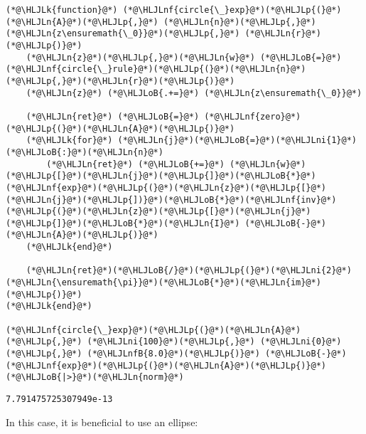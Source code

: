 \documentclass[12pt,a4paper]{article}
\newcommand{\HLJLk}[1]{\textcolor[RGB]{148,91,176}{\textbf{#1}}}
\newcommand{\HLJLn}[1]{#1}
\newcommand{\HLJLnf}[1]{\textcolor[RGB]{66,102,213}{#1}}
\newcommand{\HLJLnfB}[1]{\textcolor[RGB]{59,151,46}{#1}}
\newcommand{\HLJLni}[1]{\textcolor[RGB]{59,151,46}{#1}}
\newcommand{\HLJLoB}[1]{\textcolor[RGB]{102,102,102}{\textbf{#1}}}
\newcommand{\HLJLp}[1]{#1}
\begin{document}
\begin{lstlisting}
(*@\HLJLk{function}@*) (*@\HLJLnf{circle{\_}exp}@*)(*@\HLJLp{(}@*)(*@\HLJLn{A}@*)(*@\HLJLp{,}@*) (*@\HLJLn{n}@*)(*@\HLJLp{,}@*) (*@\HLJLn{z\ensuremath{\_0}}@*)(*@\HLJLp{,}@*) (*@\HLJLn{r}@*)(*@\HLJLp{)}@*)
    (*@\HLJLn{z}@*)(*@\HLJLp{,}@*)(*@\HLJLn{w}@*) (*@\HLJLoB{=}@*) (*@\HLJLnf{circle{\_}rule}@*)(*@\HLJLp{(}@*)(*@\HLJLn{n}@*)(*@\HLJLp{,}@*)(*@\HLJLn{r}@*)(*@\HLJLp{)}@*)
    (*@\HLJLn{z}@*) (*@\HLJLoB{.+=}@*) (*@\HLJLn{z\ensuremath{\_0}}@*)

    (*@\HLJLn{ret}@*) (*@\HLJLoB{=}@*) (*@\HLJLnf{zero}@*)(*@\HLJLp{(}@*)(*@\HLJLn{A}@*)(*@\HLJLp{)}@*)
    (*@\HLJLk{for}@*) (*@\HLJLn{j}@*)(*@\HLJLoB{=}@*)(*@\HLJLni{1}@*)(*@\HLJLoB{:}@*)(*@\HLJLn{n}@*)
        (*@\HLJLn{ret}@*) (*@\HLJLoB{+=}@*) (*@\HLJLn{w}@*)(*@\HLJLp{[}@*)(*@\HLJLn{j}@*)(*@\HLJLp{]}@*)(*@\HLJLoB{*}@*)(*@\HLJLnf{exp}@*)(*@\HLJLp{(}@*)(*@\HLJLn{z}@*)(*@\HLJLp{[}@*)(*@\HLJLn{j}@*)(*@\HLJLp{])}@*)(*@\HLJLoB{*}@*)(*@\HLJLnf{inv}@*)(*@\HLJLp{(}@*)(*@\HLJLn{z}@*)(*@\HLJLp{[}@*)(*@\HLJLn{j}@*)(*@\HLJLp{]}@*)(*@\HLJLoB{*}@*)(*@\HLJLn{I}@*) (*@\HLJLoB{-}@*) (*@\HLJLn{A}@*)(*@\HLJLp{)}@*)
    (*@\HLJLk{end}@*)

    (*@\HLJLn{ret}@*)(*@\HLJLoB{/}@*)(*@\HLJLp{(}@*)(*@\HLJLni{2}@*)(*@\HLJLn{\ensuremath{\pi}}@*)(*@\HLJLoB{*}@*)(*@\HLJLn{im}@*)(*@\HLJLp{)}@*)
(*@\HLJLk{end}@*)

(*@\HLJLnf{circle{\_}exp}@*)(*@\HLJLp{(}@*)(*@\HLJLn{A}@*)(*@\HLJLp{,}@*) (*@\HLJLni{100}@*)(*@\HLJLp{,}@*) (*@\HLJLni{0}@*)(*@\HLJLp{,}@*) (*@\HLJLnfB{8.0}@*)(*@\HLJLp{)}@*) (*@\HLJLoB{-}@*)(*@\HLJLnf{exp}@*)(*@\HLJLp{(}@*)(*@\HLJLn{A}@*)(*@\HLJLp{)}@*) (*@\HLJLoB{|>}@*)(*@\HLJLn{norm}@*)
\end{lstlisting}

\begin{lstlisting}
7.791475725307949e-13
\end{lstlisting}


In this case, it is beneficial to use an ellipse:
\end{document}
